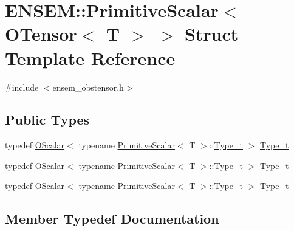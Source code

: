\hypertarget{structENSEM_1_1PrimitiveScalar_3_01OTensor_3_01T_01_4_01_4}{}\section{E\+N\+S\+EM\+:\+:Primitive\+Scalar$<$ O\+Tensor$<$ T $>$ $>$ Struct Template Reference}
\label{structENSEM_1_1PrimitiveScalar_3_01OTensor_3_01T_01_4_01_4}


{\ttfamily \#include $<$ensem\+\_\+obstensor.\+h$>$}

\subsection*{Public Types}
\begin{DoxyCompactItemize}
\item 
typedef \mbox{\hyperlink{classENSEM_1_1OScalar}{O\+Scalar}}$<$ typename \mbox{\hyperlink{structENSEM_1_1PrimitiveScalar}{Primitive\+Scalar}}$<$ T $>$\+::\mbox{\hyperlink{structENSEM_1_1PrimitiveScalar_3_01OTensor_3_01T_01_4_01_4_ac573a5e5194a65a39e552fdebda4994c}{Type\+\_\+t}} $>$ \mbox{\hyperlink{structENSEM_1_1PrimitiveScalar_3_01OTensor_3_01T_01_4_01_4_ac573a5e5194a65a39e552fdebda4994c}{Type\+\_\+t}}
\item 
typedef \mbox{\hyperlink{classENSEM_1_1OScalar}{O\+Scalar}}$<$ typename \mbox{\hyperlink{structENSEM_1_1PrimitiveScalar}{Primitive\+Scalar}}$<$ T $>$\+::\mbox{\hyperlink{structENSEM_1_1PrimitiveScalar_3_01OTensor_3_01T_01_4_01_4_ac573a5e5194a65a39e552fdebda4994c}{Type\+\_\+t}} $>$ \mbox{\hyperlink{structENSEM_1_1PrimitiveScalar_3_01OTensor_3_01T_01_4_01_4_ac573a5e5194a65a39e552fdebda4994c}{Type\+\_\+t}}
\item 
typedef \mbox{\hyperlink{classENSEM_1_1OScalar}{O\+Scalar}}$<$ typename \mbox{\hyperlink{structENSEM_1_1PrimitiveScalar}{Primitive\+Scalar}}$<$ T $>$\+::\mbox{\hyperlink{structENSEM_1_1PrimitiveScalar_3_01OTensor_3_01T_01_4_01_4_ac573a5e5194a65a39e552fdebda4994c}{Type\+\_\+t}} $>$ \mbox{\hyperlink{structENSEM_1_1PrimitiveScalar_3_01OTensor_3_01T_01_4_01_4_ac573a5e5194a65a39e552fdebda4994c}{Type\+\_\+t}}
\end{DoxyCompactItemize}


\subsection{Member Typedef Documentation}
\mbox{\label{structENSEM_1_1PrimitiveScalar_3_01OTensor_3_01T_01_4_01_4_ac573a5e5194a65a39e552fdebda4994c}} 
